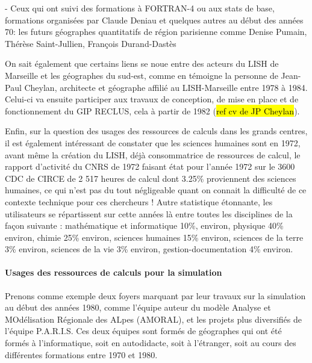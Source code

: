 - Ceux qui ont suivi des formations à FORTRAN-4 ou aux stats de base, formations organisées par Claude Deniau et quelques autres au début des années 70: les futurs géographes quantitatifs de région parisienne comme Denise Pumain, Thérèse Saint-Jullien, François Durand-Dastès

On sait également que certains liens se noue entre des acteurs du LISH de Marseille et les géographes du sud-est, comme en témoigne la personne de Jean-Paul Cheylan, architecte et géographe affilié au LISH-Marseille entre 1978 à 1984. Celui-ci va ensuite participer aux travaux de conception, de mise en place et de fonctionnement du GIP RECLUS, cela à partir de 1982 (\hl{ref cv de JP Cheylan}).

Enfin, sur la question des usages des ressources de calculs dans les grands centres, il est également intéressant de constater que les sciences humaines sont en 1972, avant même la création du LISH, déjà consommatrice de ressources de calcul, le rapport d’activité du CNRS de 1972 faisant état pour l’année 1972 sur le 3600 CDC de CIRCE de 2 517 heures de calcul dont 3.25\% proviennent des sciences humaines, ce qui n’est pas du tout négligeable quant on connait la difficulté de ce contexte technique pour ces chercheurs ! Autre statistique étonnante, les utilisateurs se répartissent sur cette années là entre toutes les disciplines  de la façon suivante : mathématique et informatique 10\%, environ, physique 40\% environ, chimie 25\% environ, sciences humaines 15\% environ, sciences de la terre 3\% environ, sciences de la vie 3\% environ, gestion-documentation 4\% environ.




\paragraph{Usages des ressources de calculs pour la simulation}

Prenons comme exemple deux foyers marquant par leur travaux sur la simulation au début des années 1980, comme l’équipe auteur du modèle Analyse et MOdélisation Régionale des ALpes (AMORAL), et les projets plus diversifiés de l’équipe P.A.R.I.S. Ces deux équipes sont formés de géographes qui ont été formés à l’informatique, soit en autodidacte, soit à l'étranger, soit au cours des différentes formations entre 1970 et 1980.

